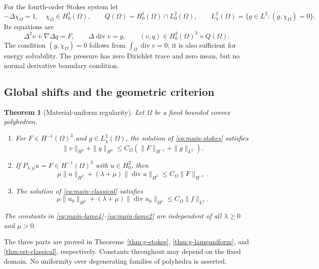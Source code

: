 \documentclass[11pt,a4paper]{article}
\newtheorem{theorem}{Theorem}[section]
\theoremstyle{remark}
\numberwithin{equation}{section}
\begin{document}
For the fourth-order Stokes system let
\[
 -\Delta\chi_\Omega=1,\quad \chi_\Omega\in H^1_0(\Omega),\qquad
 Q(\Omega)=H^1_0(\Omega)\cap L^2_0(\Omega),\qquad
 L^2_\chi(\Omega)=\{g\in L^2:(g,\chi_\Omega)=0\}.
\]
Its equations are
\begin{equation}\label{eq:main-stokes}
 \Delta^2v+\nabla\Delta q=F,\qquad
 \Delta\operatorname{div}v=g,\qquad
 (v,q)\in H^2_0(\Omega)^3\times Q(\Omega).
\end{equation}
The condition \((g,\chi_\Omega)=0\) follows from
\(\int_\Omega\operatorname{div}v=0\); it is also sufficient for energy
solvability. The pressure has zero Dirichlet trace and zero mean,
but no normal derivative boundary condition.

\subsection{Global shifts and the geometric criterion}

\begin{theorem}[Material-uniform regularity]\label{thm:main-regularity}
Let \(\Omega\) be a fixed bounded convex polyhedron.
\begin{enumerate}[label=\textup{(\roman*)}]
\item For \(F\in H^{-1}(\Omega)^3\) and \(g\in L^2_\chi(\Omega)\),
the solution of \eqref{eq:main-stokes} satisfies
\begin{equation}\label{eq:main-stokes-shift}
 \|v\|_{H^3}+\|q\|_{H^2}
 \le C_\Omega(\|F\|_{H^{-1}}+\|g\|_{L^2}).
\end{equation}
\item If \(P_{\lambda,\mu}u=F\in H^{-1}(\Omega)^3\) with \(u\in H^2_0\),
then
\begin{equation}\label{eq:main-lame4}
 \mu\|u\|_{H^3}+(\lambda+\mu)\|\operatorname{div}u\|_{H^2}
 \le C_\Omega\|F\|_{H^{-1}}.
\end{equation}
\item The solution of \eqref{eq:main-classical} satisfies
\begin{equation}\label{eq:main-lame2}
 \mu\|u_0\|_{H^2}+(\lambda+\mu)\|\operatorname{div}u_0\|_{H^1}
 \le C_\Omega\|f\|_{L^2}.
\end{equation}
\end{enumerate}
The constants in \eqref{eq:main-lame4}--\eqref{eq:main-lame2}
are independent of all \(\lambda\ge0\) and \(\mu>0\).
\end{theorem}

The three parts are proved in Theorems~\ref{thm:g-stokes},
\ref{thm:g-lameuniform}, and \ref{thm:est-classical}, respectively.
Constants throughout may depend on the fixed domain. No uniformity over
degenerating families of polyhedra is asserted.
\end{document}
